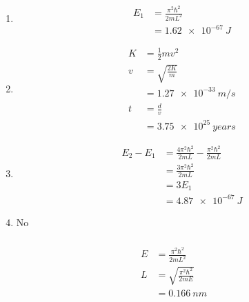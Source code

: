 \documentclass{article}
\begin{document}
\setcounter{subsubsection}{8}
\subsubsection{}

\begin{enumerate}
  \item

        \begin{align*}
          E_1 & = \frac{\pi^2 \hbar^2}{2 m L^2} \\
              & = \qty{1.62e-67}{J}
        \end{align*}

  \item

        \begin{align*}
          K & = \frac{1}{2} m v^2    \\
          v & = \sqrt{\frac{2 K}{m}} \\
            & = \qty{1.27e-33}{m/s}  \\
          t & = \frac{d}{v}          \\
            & = \qty{3.75e25}{years}
        \end{align*}

  \item

        \begin{align*}
          E_2 - E_1 & = \frac{4 \pi^2 \hbar^2}{2 m L} - \frac{\pi^2 \hbar^2}{2 m L} \\
                    & = \frac{3 \pi^2 \hbar^2}{2 m L}                               \\
                    & = 3 E_1                                                       \\
                    & = \qty{4.87e-67}{J}
        \end{align*}

  \item No
\end{enumerate}

\setcounter{subsubsection}{10}
\subsubsection{}

\begin{align*}
  E & = \frac{\pi^2 \hbar^2}{2 m L^2}      \\
  L & = \sqrt{\frac{\pi^2 \hbar^2}{2 m E}} \\
    & = \qty{0.166}{nm}
\end{align*}
\end{document}
